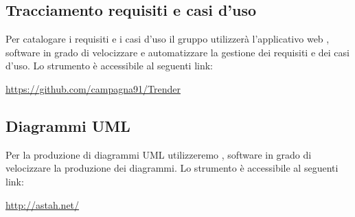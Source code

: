 \subsection{Tracciamento requisiti e casi d'uso}

Per catalogare i requisiti e i casi d'uso il gruppo utilizzerà l'applicativo web , software in grado di velocizzare e automatizzare la gestione dei requisiti e dei casi d'uso. Lo strumento è accessibile al seguenti link: \\ \centerline{\url{https://github.com/campagna91/Trender}}

\subsection{Diagrammi UML}

Per la produzione di diagrammi UML utilizzeremo , software in grado di velocizzare la produzione dei diagrammi. Lo strumento è accessibile al seguenti link: \\ \centerline{\url{http://astah.net/}}
	
